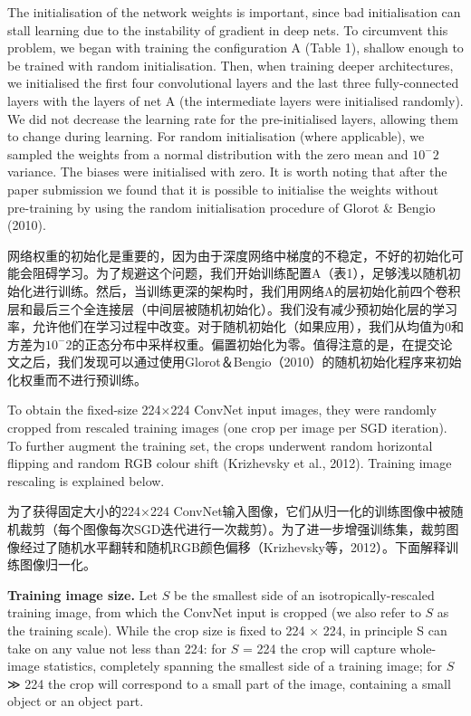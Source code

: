 \documentclass[12pt,a4paper,UTF8,twoside]{book}
\begin{document}
The initialisation of the network weights is important, since bad initialisation can stall learning due to the instability of gradient in deep nets. To circumvent this problem, we began with training the configuration A (Table 1), shallow enough to be trained with random initialisation. Then, when training deeper architectures, we initialised the first four convolutional layers and the last three fully-connected layers with the layers of net A (the intermediate layers were initialised randomly). We did not decrease the learning rate for the pre-initialised layers, allowing them to change during learning. For random initialisation (where applicable), we sampled the weights from a normal distribution with the zero mean and \(10^−2\) variance. The biases were initialised with zero. It is worth noting that after the paper submission we found that it is possible to initialise the weights without pre-training by using the random initialisation procedure of Glorot \& Bengio (2010).

网络权重的初始化是重要的，因为由于深度网络中梯度的不稳定，不好的初始化可能会阻碍学习。为了规避这个问题，我们开始训练配置A（表1），足够浅以随机初始化进行训练。然后，当训练更深的架构时，我们用网络A的层初始化前四个卷积层和最后三个全连接层（中间层被随机初始化）。我们没有减少预初始化层的学习率，允许他们在学习过程中改变。对于随机初始化（如果应用），我们从均值为0和方差为\(10^−2\)的正态分布中采样权重。偏置初始化为零。值得注意的是，在提交论文之后，我们发现可以通过使用Glorot＆Bengio（2010）的随机初始化程序来初始化权重而不进行预训练。

To obtain the fixed-size 224×224 ConvNet input images, they were randomly cropped from rescaled training images (one crop per image per SGD iteration). To further augment the training set, the crops underwent random horizontal flipping and random RGB colour shift (Krizhevsky et al., 2012). Training image rescaling is explained below.

为了获得固定大小的224×224 ConvNet输入图像，它们从归一化的训练图像中被随机裁剪（每个图像每次SGD迭代进行一次裁剪）。为了进一步增强训练集，裁剪图像经过了随机水平翻转和随机RGB颜色偏移（Krizhevsky等，2012）。下面解释训练图像归一化。

\textbf{Training image size.} Let \(S\) be the smallest side of an isotropically-rescaled training image, from which the ConvNet input is cropped (we also refer to \(S\) as the training scale). While the crop size is fixed to 224 × 224, in principle S can take on any value not less than 224: for \(S\) = 224 the crop will capture whole-image statistics, completely spanning the smallest side of a training image; for \(S\) ≫ 224 the crop will correspond to a small part of the image, containing a small object or an object part.
\end{document}
